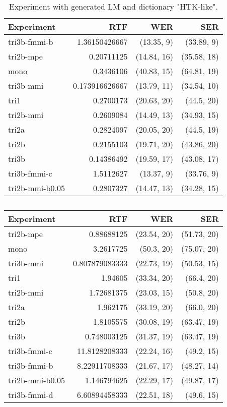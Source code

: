 \begin{table}[!htp]\label{tab:htk_like_gen_lm}\centering\begin{tabular}{l|rrr}
Experiment      & \ac{RTF}       & \ac{WER}         & \ac{SER} \\
\hline
tri3b-fmmi-b    & 1.36150426667  & (13.35, 9)  & (33.89, 9) \\ 
tri2b-mpe       & 0.20711125     & (14.84, 16) & (35.58, 18)\\ 
mono            & 0.3436106      & (40.83, 15) & (64.81, 19)\\ 
tri3b-mmi       & 0.173916626667 & (13.79, 11) & (34.54, 10)\\ 
tri1            & 0.2700173      & (20.63, 20) & (44.5, 20) \\ 
tri2b-mmi       & 0.2609084      & (14.49, 13) & (34.93, 15)\\ 
tri2a           & 0.2824097      & (20.05, 20) & (44.5, 19) \\ 
tri2b           & 0.2155103      & (19.71, 20) & (43.86, 20)\\ 
tri3b           & 0.14386492     & (19.59, 17) & (43.08, 17)\\ 
tri3b-fmmi-c    & 1.5112627      & (13.37, 9)  & (33.76, 9) \\ 
tri2b-mmi-b0.05 & 0.2807327      & (14.47, 13) & (34.28, 15)\\ 
\end{tabular}
\caption{Experiment with generated LM and dictionary "\ac{HTK}-like".}
\end{table}  

\begin{table}[!htp]\label{tab:best_oov}\centering\begin{tabular}{l|rrr}
Experiment      & \ac{RTF}       & \ac{WER}         & \ac{SER} \\
\hline
tri2b-mpe       & 0.88688125     & (23.54, 20) & (51.73, 20)\\
mono            & 3.2617725      & (50.3, 20)  & (75.07, 20)\\
tri3b-mmi       & 0.807879083333 & (22.73, 19) & (50.53, 15)\\
tri1            & 1.94605        & (33.34, 20) & (66.4, 20) \\
tri2b-mmi       & 1.72681375     & (23.03, 15) & (50.8, 20) \\
tri2a           & 1.962175       & (33.19, 20) & (66.0, 20) \\
tri2b           & 1.8105575      & (30.08, 19) & (63.47, 19)\\
tri3b           & 0.748003125    & (31.37, 19) & (63.47, 19)\\
tri3b-fmmi-c    & 11.8128208333  & (22.24, 16) & (49.2, 15) \\
tri3b-fmmi-b    & 8.22911708333  & (21.67, 17) & (48.27, 14)\\
tri2b-mmi-b0.05 & 1.146794625    & (22.29, 17) & (49.87, 17)\\
tri3b-fmmi-d    & 6.60894458333  & (22.51, 18) & (49.6, 15)
\end{tabular}
\caption{}
\end{table}  


